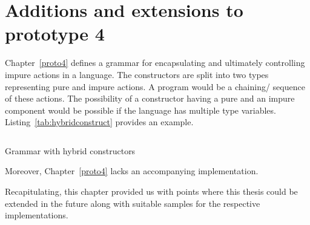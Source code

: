 \documentclass[thesis-solanki.tex]{subfiles}
\begin{document}
\section{Additions and extensions to prototype 4}
Chapter~\ref{proto4} defines a grammar for encapsulating and ultimately controlling impure actions in a language.
The constructors are split into two types representing pure and impure actions.
A program would be a chaining/ sequence of these actions.
The possibility of a constructor having a pure and an impure component would be possible if the language has
multiple type variables.
Listing~\ref{tab:hybridconstruct} provides an example.


\begin{code-list}[H]
\begin{singlespace}
\inputminted{haskell}{haskell-proto4-hybrid-construct.hs}
\end{singlespace}
\caption{Grammar with hybrid constructors}
\label{tab:hybridconstruct}
\end{code-list}

Moreover, Chapter~\ref{proto4} lacks an accompanying implementation.


Recapitulating, this chapter provided us with points where this thesis could be extended in the future along with
suitable samples for the respective implementations.


\ifMain\ifDraft
\begin{scope}
  \nolinenumbers
  \enotesize
  \par
  \begin{singlespace}
  \setlength{\parskip}{12pt plus 2pt minus 1pt}
  \theendnotes
  \par
  \end{singlespace}
\end{scope}
\fi\fi
\end{document}
